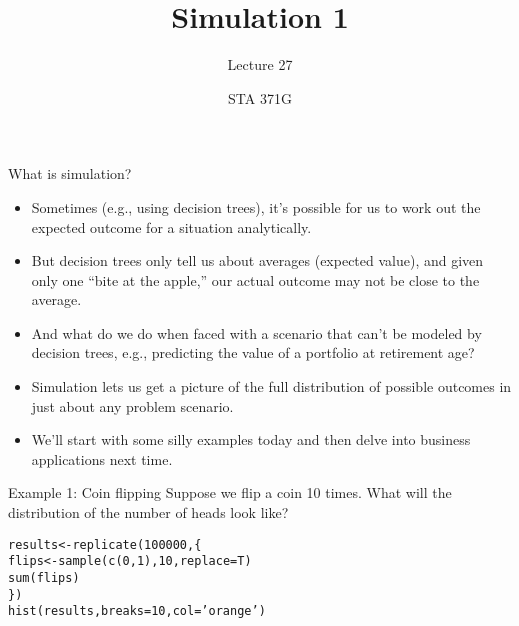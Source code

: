 \documentclass{beamer}\usepackage[]{graphicx}\usepackage[]{color}
\title{Simulation 1}
\subtitle{Lecture 27}
\author{STA 371G}
\makeatletter
\newcommand{\hlnum}[1]{\textcolor[rgb]{0.824,0.412,0.118}{#1}}%
\newcommand{\hlstr}[1]{\textcolor[rgb]{1,0.894,0.71}{#1}}%
\newcommand{\hlstd}[1]{\textcolor[rgb]{1,0.894,0.769}{#1}}%
\newcommand{\hlkwb}[1]{\textcolor[rgb]{0.804,0.776,0.451}{#1}}%
\newcommand{\hlkwc}[1]{\textcolor[rgb]{0.78,0.941,0.545}{#1}}%
\newcommand{\hlkwd}[1]{\textcolor[rgb]{1,0.78,0.769}{#1}}%
\newenvironment{kframe}{%
 \def\at@end@of@kframe{}%
 \ifinner\ifhmode%
  \def\at@end@of@kframe{\end{minipage}}%
  \begin{minipage}{\columnwidth}%
 \fi\fi%
 \def\FrameCommand##1{\hskip\@totalleftmargin \hskip-\fboxsep
 \colorbox{shadecolor}{##1}\hskip-\fboxsep
     \hskip-\linewidth \hskip-\@totalleftmargin \hskip\columnwidth}%
 \MakeFramed {\advance\hsize-\width
   \@totalleftmargin\z@ \linewidth\hsize
   \@setminipage}}%
 {\par\unskip\endMakeFramed%
 \at@end@of@kframe}
\newenvironment{knitrout}{}{} %
\makeatother
\begin{document}
  
  

  \frame{\maketitle}



  \begin{darkframes}
    \begin{frame}{What is simulation?}
      \begin{itemize}[<+->]
        \item Sometimes (e.g., using decision trees), it's possible for us to work out the expected outcome for a situation analytically.
        \item But decision trees only tell us about averages (expected value), and given only one ``bite at the apple,'' our actual outcome may not be close to the average.
        \item And what do we do when faced with a scenario that can't be modeled by decision trees, e.g., predicting the value of a portfolio at retirement age?
        \item Simulation lets us get a picture of the full distribution of possible outcomes in just about any problem scenario.
        \item We'll start with some silly examples today and then delve into business applications next time.
      \end{itemize}
    \end{frame}

    \begin{frame}{Example 1: Coin flipping}
      Suppose we flip a coin 10 times. What will the distribution of the number of heads look like?
      \lc
    \end{frame}

    \begin{frame}[fragile]
      \fontsize{10}{10}\selectfont
\begin{knitrout}
\begin{kframe}
\begin{alltt}
\hlstd{results} \hlkwb{<-} \hlkwd{replicate}\hlstd{(}\hlnum{100000}\hlstd{, \{}
  \hlstd{flips} \hlkwb{<-} \hlkwd{sample}\hlstd{(}\hlkwd{c}\hlstd{(}\hlnum{0}\hlstd{,} \hlnum{1}\hlstd{),} \hlnum{10}\hlstd{,} \hlkwc{replace}\hlstd{=T)}
  \hlkwd{sum}\hlstd{(flips)}
\hlstd{\})}
\hlkwd{hist}\hlstd{(results,} \hlkwc{breaks}\hlstd{=}\hlnum{10}\hlstd{,} \hlkwc{col}\hlstd{=}\hlstr{'orange'}\hlstd{)}
\end{alltt}
\end{kframe}



\end{knitrout}
\end{frame}
\end{darkframes}
\end{document}
